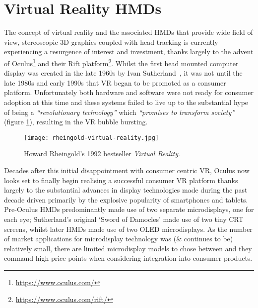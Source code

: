 
\section{Virtual Reality HMDs}
The concept of virtual reality and the associated HMDs that provide wide field of view, stereoscopic 3D graphics coupled with head tracking is currently experiencing a resurgence of interest and investment, thanks largely to the advent of Oculus\footnote{\url{https://www.oculus.com/}} and their Rift platform\footnote{\url{https://www.oculus.com/rift/}}. Whilst the first head mounted computer display was created in the late 1960s by Ivan Sutherland~\cite{Rheingold1992}, it was not until the late 1980s and early 1990s that VR began to be promoted as a consumer platform. Unfortunately both hardware and software were not ready for consumer adoption at this time and these systems failed to live up to the substantial hype of being a \textit{``revolutionary technology''} which \textit{``promises to transform society''} (figure \ref{rheingold-virtual-reality.jpg}), resulting in the VR bubble bursting.

\begin{figure}[h]
	\begin{center}
		\texttt{[image: rheingold-virtual-reality.jpg]}
		\caption{Howard Rheingold's 1992 bestseller \textit{Virtual Reality}.}
		\label{rheingold-virtual-reality.jpg}
	\end{center}
\end{figure}

Decades after this initial disappointment with consumer centric VR, Oculus now looks set to finally begin realising a successful consumer VR platform thanks largely to the substantial advances in display technologies made during the past decade driven primarily by the explosive popularity of smartphones and tablets. Pre-Oculus HMDs predominantly made use of two separate microdisplays, one for each eye; Sutherland's original `Sword of Damocles' made use of two tiny CRT screens, whilst later HMDs made use of two OLED microdisplays. As the number of market applications for microdisplay technology was (\& continues to be) relatively small, there are limited microdisplay models to chose between and they command high price points when considering integration into consumer products.

